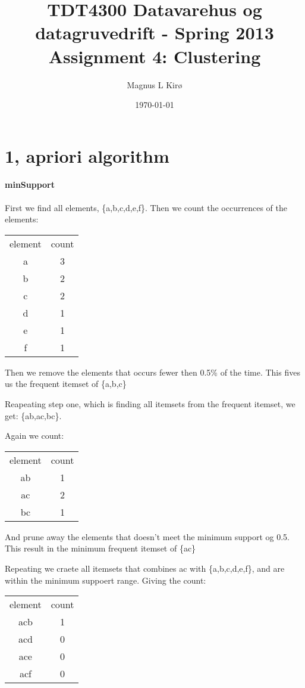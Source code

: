 \documentclass[12pt, a4paper]{article}
\title{TDT4300 Datavarehus og datagruvedrift - Spring 2013 \\ Assignment 4: Clustering }
\author{
        Magnus L Kirø \\
}
\date{\today}
\begin{document}
\maketitle
{}

\section{1, apriori algorithm}

\paragraph{minSupport}
First we find all elements, \{a,b,c,d,e,f\}.
Then we count the occurrences of the elements:
\begin{tabular}{ c c }
element & count \\
a & 3 \\
b & 2 \\
c & 2 \\
d & 1 \\
e & 1 \\
f & 1 \\
\end{tabular}

Then we remove the elements that occurs fewer then 0.5\% of the time. 
This fives us the frequent itemset of \{a,b,c\}

Reapeating step one, which is finding all itemsets from the frequent itemset, we get: 
\{ab,ac,bc\}.

Again we count: 
\begin{tabular}{ c c }
element & count \\
ab & 1 \\
ac & 2 \\
bc & 1 \\
\end{tabular}

And prune away the elements that doesn't meet the minimum support og 0.5.
This result in the minimum frequent itemset of \{ac\}

Repeating we craete all itemsets that combines ac with \{a,b,c,d,e,f\}, and are within the minimum suppoert range. 
Giving the count:
\begin{tabular}{ c c }
element & count \\
acb & 1 \\
acd & 0 \\
ace & 0 \\
acf & 0 \\
\end{tabular}
\end{document}

